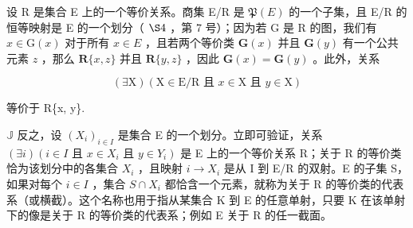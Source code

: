 设 R 是集合 E 上的一个等价关系。商集 E/R 是 \(\mathfrak{P}(E)\) 的一个子集，且 E/R 的恒等映射是 E 的一个划分（ \(\S4\) ，第 7 号）；因为若 G 是 R 的图，我们有 \(x \in \mathrm{G}(x)\) 对于所有 \(x \in E\) ，且若两个等价类 \(\mathbf{G}(x)\) 并且 \(\mathbf{G}(y)\) 有一个公共元素 \(z\) ，那么 \(\mathbf{R}\{x, z\}\) 并且 \(\mathbf{R}\{y, z\}\) ，因此 \(\mathbf{G}(x) = \mathbf{G}(y)\) 。此外，关系

\[
(\exists \mathrm{X}) (\mathrm{X} \in \mathrm{E} / \mathrm{R} \text { 且 } x \in \mathrm{X} \text { 且 } y \in \mathrm{X})
\]

等价于 R\{x, y\}.

\(\mathbb{J}\) 反之，设 \((X_{i})_{i\in I}\) 是集合 E 的一个划分。立即可验证，关系 \((\exists i)(i\in I \text{ 且 } x\in X_{i} \text{ 且 } y\in Y_{i})\) 是 E 上的一个等价关系 R；关于 R 的等价类恰为该划分中的各集合 \(X_{i}\) ，且映射 \(i\to X_{i}\) 是从 I 到 E/R 的双射。E 的子集 S，如果对每个 \(i\in I\) ，集合 \(S\cap X_{i}\) 都恰含一个元素，就称为关于 R 的等价类的代表系（或横截）。这个名称也用于指从某集合 K 到 E 的任意单射，只要 K 在该单射下的像是关于 R 的等价类的代表系；例如 E 关于 R 的任一截面。

